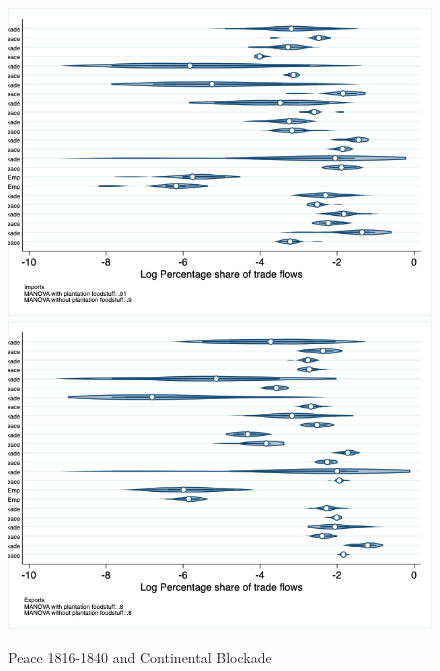 \documentclass[12pt,a4paper,notitlepage,english]{article}
\begin{document}
\begin{figure}
\centering
\caption{Peace 1816-1840 and Continental Blockade}
\label{peace1816_1840_block_nat_distr}
\includegraphics[scale=.4]{peace1816_1840_block_nat_distr_Ipays}
\includegraphics[scale=.4]{peace1816_1840_block_nat_distr_Xpays}
\end{figure}
\end{document}
